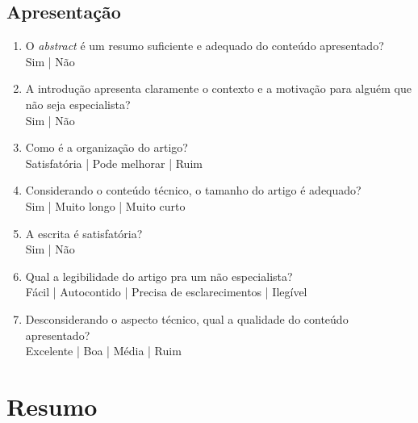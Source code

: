 \documentclass{UnBExam}%
\begin{document}
	\subsection{Apresentação}%
	\begin{enumerate}
		\item O \emph{abstract} é um resumo suficiente e adequado do conteúdo
		apresentado?\\%
		Sim | Não

		\item A introdução apresenta claramente o contexto e a motivação para
		alguém que não seja especialista?\\%
		Sim | Não

		\item Como é a organização do artigo?\\%
		Satisfatória | Pode melhorar | Ruim

		\item Considerando o conteúdo técnico, o tamanho do artigo é adequado?\\%
		Sim | Muito longo | Muito curto

		\item A escrita é satisfatória?\\%
		Sim | Não

		\item Qual a legibilidade do artigo pra um não especialista?\\%
		Fácil | Autocontido | Precisa de esclarecimentos | Ilegível

		\item Desconsiderando o aspecto técnico, qual a qualidade do conteúdo
		apresentado?\\%
		Excelente | Boa | Média | Ruim
	\end{enumerate}%

	\section{Resumo}%
\end{document}
